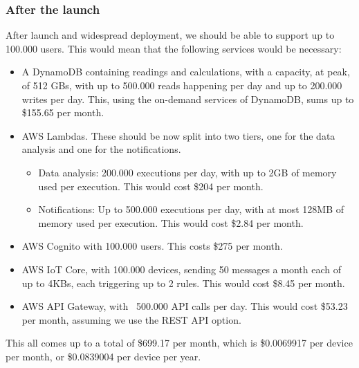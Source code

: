 \subsubsection*{After the launch}
After launch and widespread deployment, we should be able to support up to 100.000
users. This would mean that the following services would be necessary:
\begin{itemize}
    \item A DynamoDB containing readings and calculations, with a capacity, at peak, of
          512 GBs, with up to 500.000 reads happening per day and up to
          200.000 writes per day. This, using the on-demand services of DynamoDB,
          sums up to \$155.65 per month.
    \item AWS Lambdas. These should be now split
          into two tiers, one for the data analysis and one for the notifications.
          \begin{itemize}
            \item Data analysis: 200.000 executions per day, with up to 2GB of memory
                  used per execution. This would cost \$204 per month.
            \item Notifications: Up to 500.000 executions per day, with at most
                  128MB of memory used per execution. This would cost \$2.84 per
                  month.
          \end{itemize}
    \item AWS Cognito with 100.000 users. This costs \$275 per month.
    \item AWS IoT Core, with 100.000 devices, sending 50 messages a month each of 
          up to 4KBs, each triggering up to 2 rules. This would cost \$8.45 per
          month.
    \item AWS API Gateway, with ~500.000 API calls per day. This would cost \$53.23
          per month, assuming we use the REST API option.
\end{itemize}

This all comes up to a total of \$699.17 per month, which is \$0.0069917 per device
per month, or \$0.0839004 per device per year.